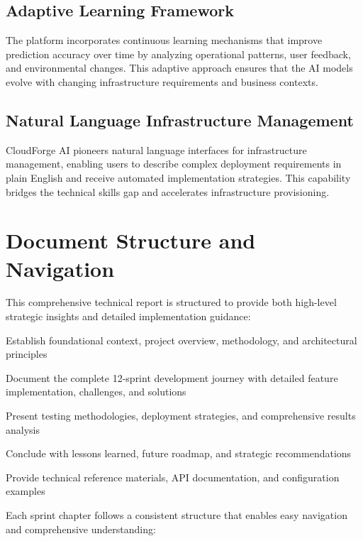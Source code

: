 \subsection{Adaptive Learning Framework}

The platform incorporates continuous learning mechanisms that improve prediction accuracy over time by analyzing operational patterns, user feedback, and environmental changes. This adaptive approach ensures that the AI models evolve with changing infrastructure requirements and business contexts.

\subsection{Natural Language Infrastructure Management}

CloudForge AI pioneers natural language interfaces for infrastructure management, enabling users to describe complex deployment requirements in plain English and receive automated implementation strategies. This capability bridges the technical skills gap and accelerates infrastructure provisioning.

\section{Document Structure and Navigation}

This comprehensive technical report is structured to provide both high-level strategic insights and detailed implementation guidance:

\begin{description}[leftmargin=*]
    \item[Chapters 1-4] Establish foundational context, project overview, methodology, and architectural principles
    \item[Chapters 5-16] Document the complete 12-sprint development journey with detailed feature implementation, challenges, and solutions
    \item[Chapters 17-19] Present testing methodologies, deployment strategies, and comprehensive results analysis
    \item[Chapter 20] Conclude with lessons learned, future roadmap, and strategic recommendations
    \item[Appendices] Provide technical reference materials, API documentation, and configuration examples
\end{description}

Each sprint chapter follows a consistent structure that enables easy navigation and comprehensive understanding:

